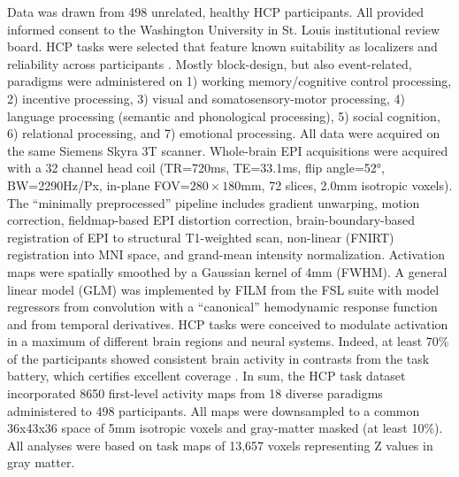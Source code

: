 \documentclass{article} %
\begin{document}
Data was drawn from 498 unrelated, healthy HCP participants.
All provided informed consent to the Washington
University in St. Louis institutional review board. HCP tasks 
were selected that feature known suitability as localizers
and reliability
across participants \cite{barch2013}.
Mostly block-design, but also event-related, paradigms were
administered on 1) working memory/cognitive control processing, 2)
incentive processing, 3) visual and somatosensory-motor processing,
4) language processing (semantic and phonological processing),
5) social cognition, 6) relational processing, and 7) emotional
processing. All data were acquired on the same Siemens Skyra 3T scanner.
Whole-brain EPI acquisitions were acquired with a
32 channel head coil (TR=720ms, TE=33.1ms, flip angle=52°, BW=2290Hz/Px,
in-plane FOV=$280\times180$mm, 72 slices, 2.0mm isotropic voxels).
The “minimally preprocessed” pipeline \cite{glass13} includes
gradient unwarping, motion correction, fieldmap-based EPI distortion
correction, brain-boundary-based registration of EPI to structural
T1-weighted scan, non-linear (FNIRT) registration into MNI space,
and grand-mean intensity normalization. Activation maps were spatially
smoothed by a Gaussian kernel of 4mm (FWHM). A general linear model (GLM) was
implemented by FILM from the FSL suite with model regressors from convolution
with a “canonical” hemodynamic response function and from temporal derivatives.
HCP tasks were conceived to modulate activation
in a maximum of different brain regions and neural systems. Indeed, at
least 70\% of the participants showed consistent brain activity in
contrasts from the task battery, which certifies excellent
coverage \cite{barch2013}.
In sum, the HCP task dataset incorporated 8650 first-level activity maps
from 18 diverse paradigms administered to 498 participants.
All maps were downsampled to a common 36x43x36 space of
5mm isotropic voxels and gray-matter masked (at least 10\%).
All analyses were based on task maps of
13,657 voxels representing Z values in gray matter.
\linebreak
\end{document}
